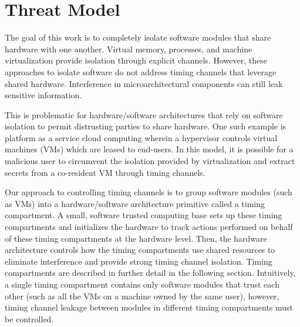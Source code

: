 \section{ Threat Model }

    The goal of this work is to completely isolate software modules that share
    hardware with one another. Virtual memory, processes, and machine 
    virtualization provide isolation through explicit channels. However, these 
    approaches to isolate software do not address timing channels that leverage 
    shared hardware. Interference in microarchitectural components can still 
    leak sensitive information.
    
    This is problematic for hardware/software architectures that rely on 
    software isolation to permit distrusting parties to share hardware. One 
    such example is platform as a service cloud computing wherein a hypervisor 
    controls virtual machines (VMs)
    which are leased to end-users. In this model, it is possible for a 
    malicious user to circumvent the isolation provided by virtualization and 
    extract secrets from a co-resident VM  through timing channels.

    Our approach to controlling timing channels is to group software modules 
    (such as VMs) into a hardware/software architecture primitive called a 
    timing compartment. A small, software trusted computing
    base sets up these timing compartments and initializes the hardware to 
    track actions performed on behalf of these timing compartments at the 
    hardware level. Then, the hardware architecture controls how the timing 
    compartments use shared resources to eliminate interference and provide 
    strong timing channel isolation. Timing compartments are described in 
    further detail in the following section. Intuitively, a single timing 
    compartment contains only software modules that trust each other (such as 
    all the VMs on a machine owned by the same user), however, timing channel 
    leakage between modules in different timing compartments must be 
    controlled.

